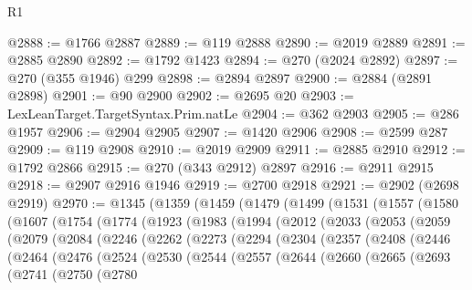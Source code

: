 \begin{lexlean}{R1}
\begin{coremodule}
@2888 := @1766 @2887
@2889 := @119 @2888
@2890 := @2019 @2889
@2891 := @2885 @2890
@2892 := @1792 @1423
@2894 := @270 (@2024 @2892)
@2897 := @270 (@355 @1946) @299
@2898 := @2894 @2897
@2900 := @2884 (@2891 @2898)
@2901 := @90 @2900
@2902 := @2695 @20
@2903 := LexLeanTarget.TargetSyntax.Prim.natLe
@2904 := @362 @2903
@2905 := @286 @1957
@2906 := @2904 @2905
@2907 := @1420 @2906
@2908 := @2599 @287
@2909 := @119 @2908
@2910 := @2019 @2909
@2911 := @2885 @2910
@2912 := @1792 @2866
@2915 := @270 (@343 @2912) @2897
@2916 := @2911 @2915
@2918 := @2907 @2916 @1946
@2919 := @2700 @2918
@2921 := @2902 (@2698 @2919)
@2970 := @1345
    (@1359
      (@1459
        (@1479
          (@1499
            (@1531
              (@1557
                (@1580
                  (@1607
                    (@1754
                      (@1774
                        (@1923
                          (@1983
                            (@1994
                              (@2012
                                (@2033
                                  (@2053
                                    (@2059
                                      (@2079
                                        (@2084
                                          (@2246
                                            (@2262
                                              (@2273
                                                (@2294
                                                  (@2304
                                                    (@2357
                                                      (@2408
                                                        (@2446
                                                          (@2464
                                                            (@2476
                                                              (@2524
                                                                (@2530
                                                                  (@2544
                                                                    (@2557
                                                                      (@2644
                                                                        (@2660
                                                                          (@2665
                                                                            (@2693
                                                                              (@2741
                                                                                (@2750
                                                                                  (@2780

\end{coremodule}
\end{lexlean}
